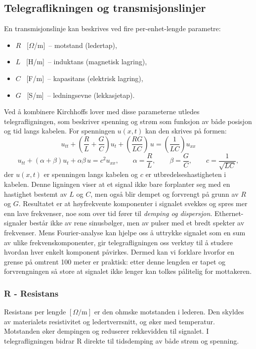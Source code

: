 \subsection{Telegraflikningen og transmisjonslinjer}
En transmisjonslinje kan beskrives ved fire per-enhet-lengde parametre:
\begin{itemize}
    \item $R$ \, [$\Omega$/m] \,-- motstand (ledertap),
    \item $L$ \, [H/m] \,-- induktans (magnetisk lagring),
    \item $C$ \, [F/m] \,-- kapasitans (elektrisk lagring),
    \item $G$ \, [S/m] \,-- ledningsevne (lekkasjetap).
\end{itemize}
Ved å kombinere Kirchhoffs lover med disse parameterne utledes telegrafligningen, som beskriver spenning og strøm som funksjon av både posisjon og tid langs kabelen. For spenningen $u(x,t)$ kan den skrives på formen:
\begin{equation}
    u_{tt} + \left(\frac{R}{L} + \frac{G}{C}\right)u_t + \left(\frac{RG}{LC}\right)\,u = \left(\frac{1}{LC}\right) u_{xx}
\end{equation}
\[
    u_{tt} + \left(\alpha + \beta\right)u_t + \alpha\beta\,u = c^2 u_{xx}, \qquad \alpha=\frac{R}{L}, \qquad \beta=\frac{G}{C}, \qquad c = \frac{1}{\sqrt{LC}} ,
\]
der $u(x,t)$ er spenningen langs kabelen og $c$ er utbredelseshastigheten i kabelen.  
Denne ligningen viser at et signal ikke bare forplanter seg med en hastighet bestemt av $L$ og $C$, men også blir dempet og forvrengt på grunn av $R$ og $G$. Resultatet er at høyfrekvente komponenter i signalet svekkes og spres mer enn lave frekvenser, noe som over tid fører til \emph{demping og dispersjon}.  
Ethernet-signaler består ikke av rene sinusbølger, men av pulser med et bredt spekter av frekvenser. Mens Fourier-analyse kan hjelpe oss  å uttrykke signalet som en sum av ulike frekvenskomponenter, gir telegrafligningen oss verktøy til å studere hvordan hver enkelt komponent påvirkes. Dermed kan vi forklare hvorfor en grense på omtrent 100 meter er praktisk: etter denne lengden er tapet og forvrengningen så store at signalet ikke lenger kan tolkes pålitelig for mottakeren.


\subsubsection{R - Resistans}
Resistans per lengde $[\Omega/\mathrm{m}]$ er den ohmske motstanden i lederen. Den skyldes av materialets resistivitet og ledertverrsnitt, og øker med temperatur. Motstanden øker dempingen og reduserer rekkevidden til signalet. I telegrafligningen bidrar R direkte til tidsdemping av både strøm og spenning.

